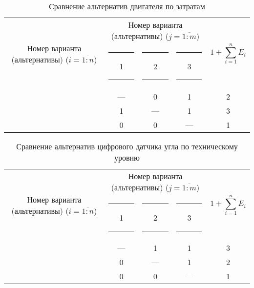 \begin{table}[ht!]
    \centering
    \begin{tabular}{|c|c|c|c|c|}
        \hline
        \multirow{2}{2.4cm}[-0.5pc]{
            \centering
            Номер варианта (альтернативы) ($i = \overline{1:n}$)
        } &
        \multicolumn{3}{c|}{
            \parbox[t]{2.4cm}{
                \centering
                Номер варианта (альтернативы) ($j = \overline{1:m}$)
            }
        } &
        \multirow{2}{1.7cm}{
            \centering
            $$1 + \sum_{i=1}^n E_i$$
        } \\
        &
        \centering \rule{2pt}{0pt} 1 \rule{2pt}{0pt} &
        \centering \rule{2pt}{0pt} 2 \rule{2pt}{0pt} &
        \centering \rule{2pt}{0pt} 3 \rule{2pt}{0pt} & \\
        \hline \hline
        \centering{1} &---& 0 & 1 & 2 \\ \hline
        \centering{2} & 1 &---& 1 & 3 \\ \hline
        \centering{3} & 0 & 0 &---& 1 \\ \hline
    \end{tabular}
    \caption{Сравнение альтернатив двигателя по затратам}
    \label{tbl_motor_cost_lvl_comparison}
\end{table}

\begin{table}[ht!]
    \centering
    \begin{tabular}{|c|c|c|c|c|}
        \hline
        \multirow{2}{2.4cm}[-0.5pc]{
            \centering
            Номер варианта (альтернативы) ($i = \overline{1:n}$)
        } &
        \multicolumn{3}{c|}{
            \parbox[t]{2.4cm}{
                \centering
                Номер варианта (альтернативы) ($j = \overline{1:m}$)
            }
        } &
        \multirow{2}{1.7cm}{
            \centering
            $$1 + \sum_{i=1}^n E_i$$
        } \\
        &
        \centering \rule{2pt}{0pt} 1 \rule{2pt}{0pt} &
        \centering \rule{2pt}{0pt} 2 \rule{2pt}{0pt} &
        \centering \rule{2pt}{0pt} 3 \rule{2pt}{0pt} & \\
        \hline \hline
        \centering{1} &---& 1 & 1 & 3 \\ \hline
        \centering{2} & 0 &---& 1 & 2 \\ \hline
        \centering{3} & 0 & 0 &---& 1 \\ \hline
    \end{tabular}
    \caption{Сравнение альтернатив цифрового датчика угла по техническому уровню}
    \label{tbl_sensor_tech_lvl_comparison}
\end{table}

